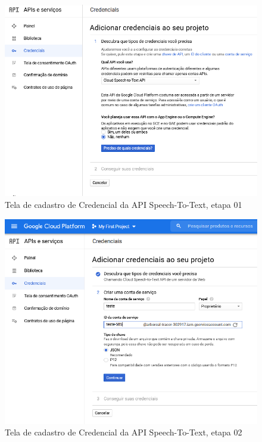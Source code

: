 \begin{figure}[h!]
\centering
\caption{Tela de cadastro de Credencial da API Speech-To-Text, etapa 01}
\label{criarCredencial}
\includegraphics[width=150mm]{images/ConfigurarGoogle/criarCredencialEtapa1.PNG}
\end{figure}

\begin{figure}[h!]
\centering
\caption{Tela de cadastro de Credencial da API Speech-To-Text, etapa 02}
\label{criarCredencial2}
\includegraphics[width=150mm]{images/ConfigurarGoogle/criarCredencialEtapa2.PNG}
\end{figure}

